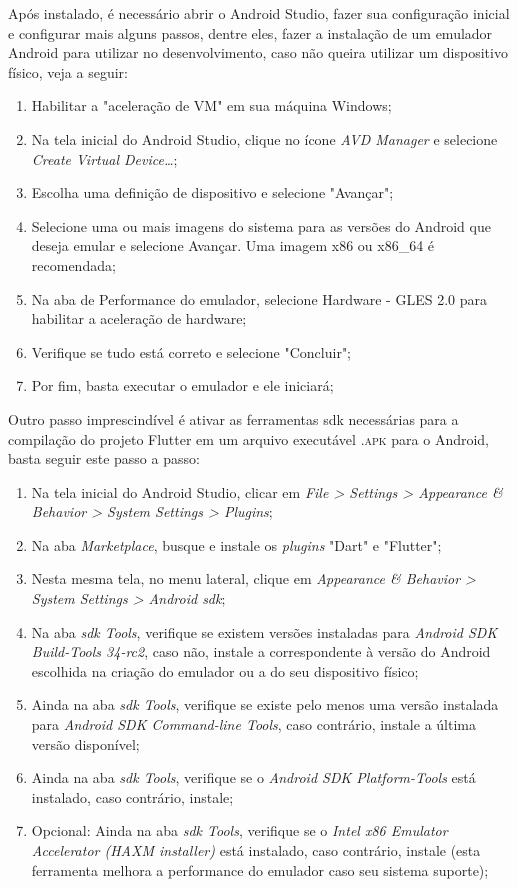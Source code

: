 Após instalado, é necessário abrir o Android Studio, fazer sua configuração inicial e configurar mais alguns passos, dentre eles, fazer a instalação de um emulador Android para utilizar no desenvolvimento, caso não queira utilizar um dispositivo físico, veja a seguir:
\begin{enumerate}
   \item Habilitar a "aceleração de VM" em sua máquina Windows;
   \item Na tela inicial do Android Studio, clique no ícone \textit{AVD Manager} e selecione \textit{Create Virtual Device…};
   \item Escolha uma definição de dispositivo e selecione "Avançar";
   \item Selecione uma ou mais imagens do sistema para as versões do Android que deseja emular e selecione Avançar. Uma imagem x86 ou x86\_64 é recomendada;
   \item Na aba de Performance do emulador, selecione Hardware - GLES 2.0 para habilitar a aceleração de hardware;
   \item Verifique se tudo está correto e selecione "Concluir";
   \item Por fim, basta executar o emulador e ele iniciará;
 \end{enumerate}

 Outro passo imprescindível é ativar as ferramentas \ac{sdk} necessárias para a compilação do projeto Flutter em um arquivo executável \textsc{.apk} para o Android, basta seguir este passo a passo:
 
 \begin{enumerate}
   \item Na tela inicial do Android Studio, clicar em \textit{File > Settings > Appearance \& Behavior > System Settings > \textit{Plugins}};
   \item Na aba \textit{Marketplace}, busque e instale os \textit{plugins} "Dart" e "Flutter";
   \item Nesta mesma tela, no menu lateral, clique em \textit{Appearance \& Behavior > System Settings > Android \ac{sdk}};
   \item Na aba \textit{\ac{sdk} Tools}, verifique se existem versões instaladas para \textit{Android SDK Build-Tools 34-rc2}, caso não, instale a correspondente à versão do Android escolhida na criação do emulador ou a do seu dispositivo físico;
   \item Ainda na aba \textit{\ac{sdk} Tools}, verifique se existe pelo menos uma versão instalada para \textit{Android SDK Command-line Tools}, caso contrário, instale a última versão disponível;
   \item Ainda na aba \textit{\ac{sdk} Tools}, verifique se o \textit{Android SDK Platform-Tools} está instalado, caso contrário, instale;
   \item Opcional: Ainda na aba \textit{\ac{sdk} Tools}, verifique se o \textit{Intel x86 Emulator Accelerator (HAXM installer)} está instalado, caso contrário, instale (esta ferramenta melhora a performance do emulador caso seu sistema suporte);
 \end{enumerate}
 

